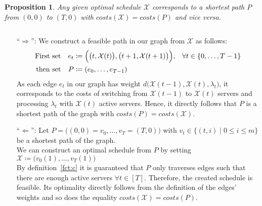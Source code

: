 \documentclass[hidelinks]{article}
\makeatletter
\renewenvironment{proof}[1][\proofname]{\par
  \vspace{-\parskip}%
  \pushQED{\qed}%
  \normalfont
  \topsep0pt \partopsep0pt %
  \trivlist
  \item[\hskip\labelsep
        \itshape
    #1\@addpunct{.}]\ignorespaces
}{%
  \popQED\endtrivlist\@endpefalse
  \addvspace{6pt plus 6pt} %
}
\theoremstyle{plain}
\newtheorem{prop}[thm]{Proposition}
\theoremstyle{definition}
\theoremstyle{rem}
\newcommand{\mx}{\mathcal{X}}
\newcommand{\fromto}[2]{\{#1,\ldots,#2\}}
\makeatother
\begin{document}
\begin{prop}
	Any given optimal schedule $\mx$ corresponds to a shortest path $P$ from $(0,0)$ to $(T,0)$ with $costs(\mx)=costs(P)$ and vice versa.
\end{prop} 
\begin{proof}
$ $
\begin{itemize}
	\item[``$\Rightarrow$'':] We construct a feasible path in our graph from $\mx$ as follows:
\begin{align*}
	\text{First set}&&e_t&\coloneqq\Bigl(\bigl(t,\mx(t)\bigr),\bigl(t+1,\mx(t+1)\bigr)\Bigr),&\forall t\in\fromto{0}{T-1}\\
	\text{then set}&&P&\coloneqq(e_0,\ldots,e_{T-1})
\end{align*}
As each edge $e_t$ in our graph has weight $d\bigl(\mx(t-1),\mx(t),\lambda_{t}\bigr)$, it corresponds to the costs of switching from $\mx(t-1)$ to $\mx(t)$ servers and processing $\lambda_{t}$ with $\mx(t)$ active servers. Hence, it directly follows that $P$ is a shortest path of the graph with $costs(P)=costs(\mx)$.
	\item[``$\Leftarrow$'':] Let $P=\bigl((0,0)=v_0,\ldots,v_T=(T,0)\bigr)$ with $v_t\in\bigl\{(t,i)\mid 0\le i\le m\bigr\}$ be a shortest path of the graph.\\ 
	We can construct an optimal schedule from $P$ by setting $\mx\coloneqq\bigl(v_0(1),\ldots,v_T(1)\bigr)$\\
	By definition~\eqref{fct:c} it is guaranteed that $P$ only traverses edges such that there are enough active servers $\forall t\in[T]$. Therefore, the created schedule is feasible. Its optimality directly follows from the definition of the edges' weights and so does the equality $costs(\mx)=costs(P)$.
\end{itemize}
\end{proof}
\end{document}
